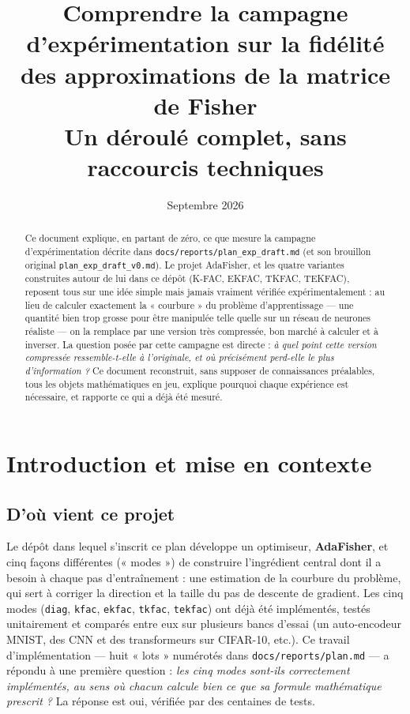 \documentclass[11pt,a4paper]{article}
\title{\Large Comprendre la campagne d'expérimentation sur la fidélité\\des approximations de la matrice de Fisher\\[4pt]\large Un déroulé complet, sans raccourcis techniques}
\author{}
\date{Septembre 2026}
\begin{document}
\maketitle

\begin{abstract}
\noindent Ce document explique, en partant de zéro, ce que mesure la campagne d'expérimentation
décrite dans \texttt{docs/reports/plan\_exp\_draft.md} (et son brouillon original
\texttt{plan\_exp\_draft\_v0.md}). Le projet AdaFisher, et les quatre variantes construites autour
de lui dans ce dépôt (K-FAC, EKFAC, TKFAC, TEKFAC), reposent tous sur une idée simple mais jamais
vraiment vérifiée expérimentalement : au lieu de calculer exactement la « courbure » du problème
d'apprentissage — une quantité bien trop grosse pour être manipulée telle quelle sur un réseau de
neurones réaliste — on la remplace par une version très compressée, bon marché à calculer et à
inverser. La question posée par cette campagne est directe : \emph{à quel point cette version
compressée ressemble-t-elle à l'originale, et où précisément perd-elle le plus d'information ?}
Ce document reconstruit, sans supposer de connaissances préalables, tous les objets mathématiques
en jeu, explique pourquoi chaque expérience est nécessaire, et rapporte ce qui a déjà été mesuré.
\end{abstract}

\tableofcontents

\section{Introduction et mise en contexte}

\subsection{D'où vient ce projet}

Le dépôt dans lequel s'inscrit ce plan développe un optimiseur, \textbf{AdaFisher}, et cinq façons
différentes (« modes ») de construire l'ingrédient central dont il a besoin à chaque pas
d'entraînement : une estimation de la courbure du problème, qui sert à corriger la direction et la
taille du pas de descente de gradient. Les cinq modes (\texttt{diag}, \texttt{kfac}, \texttt{ekfac},
\texttt{tkfac}, \texttt{tekfac}) ont déjà été implémentés, testés unitairement et comparés entre eux
sur plusieurs bancs d'essai (un auto-encodeur MNIST, des CNN et des transformeurs sur CIFAR-10, etc.).
Ce travail d'implémentation — huit « lots » numérotés dans \texttt{docs/reports/plan.md} — a répondu
à une première question : \emph{les cinq modes sont-ils correctement implémentés, au sens où chacun
calcule bien ce que sa formule mathématique prescrit ?} La réponse est oui, vérifiée par des
centaines de tests.
\end{document}

